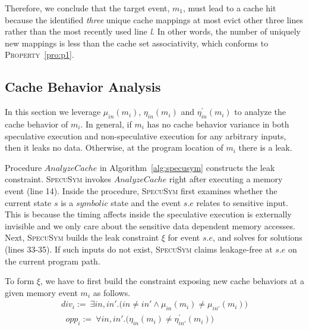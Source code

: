 \documentclass[sigconf]{acmart}
\newcommand{\SpecuSym}{\textsc{SpecuSym} }
\begin{document}
Therefore, we conclude that the target event, $\mathit{m_1}$, must lead to a 
cache hit because the identified \emph{three} unique cache mappings at most 
evict other three lines rather than the most recently used line \emph{l}. In 
other words, the number of uniquely new mappings is less than the cache set 
associativity, which conforms to \textsc{Property}~\ref{pro:p1}.


\subsection{Cache Behavior Analysis}
\label{sec:analysis}

In this section we leverage $\mathit{\mu_{in}(m_i)}$, $\mathit{\eta_{in}(m_i)}$ 
and $\mathit{\eta^\prime_{in}(m_i)}$ to analyze the cache behavior of $\mathit{m_i}$. 
In general, if $\mathit{m_i}$ has no cache behavior variance in both speculative 
execution and non-speculative execution for any arbitrary inputs, then it leaks 
no data. Otherwise, at the program location of $\mathit{m_i}$ there is a leak. 



Procedure $\mathit{AnalyzeCache}$ in Algorithm~\ref{alg:specusym} constructs the 
leak constraint. \SpecuSym invokes $\mathit{AnalyzeCache}$ right after executing
a memory event (line 14). Inside the procedure, \SpecuSym first examines whether 
the current state $s$ is a $\mathit{symbolic}$ state and the event $s.e$ relates 
to sensitive input. This is because the timing affects inside the speculative 
execution is externally invisible and we only care about the sensitive data dependent 
memory accesses. Next, \SpecuSym builds the leak constraint $\xi$ for event $s.e$, and 
solves for solutions (lines 33-35). If such inputs do not exist, \SpecuSym claims 
leakage-free at $s.e$ on the current program path.

To form $\xi$, we have to first build the constraint exposing new cache behaviors
at a given memory event $\mathit{m_i}$ as follows.
%
\begin{multline}
  \label{eqn:new_behav}
  ~~~~~~~
  \mathit{div_i}:=~
  \exists\mathit{in,in'}.
  \big(
  \mathit{in\neq in'\wedge\mu_{in}(m_i) \neq \mu_{in'}(m_i)}
  \big)
  ~~~~~~~
\end{multline}
%
\begin{multline}
  \label{eqn:new_behav}
  ~~~~~~~
  \mathit{opp_i}:=~
  \forall\mathit{in,in'}.
  \big(
  \mathit{\eta_{in}(m_i)\neq\eta_{in'}^\prime(m_i)}
  \big)
  ~~~~~~~~~~~~~~~~~~~~~~~
\end{multline}
%
\end{document}
